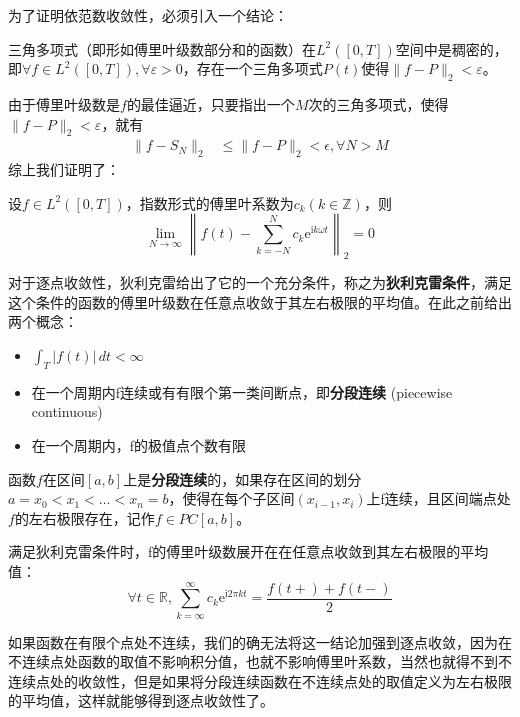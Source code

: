 \documentclass{ctexbook}
\begin{document}
为了证明依范数收敛性，必须引入一个结论：
\begin{claim}
    三角多项式（即形如傅里叶级数部分和的函数）在$L^2([0,T])$空间中是稠密的，即$\forall f\in L^2([0,T]),\forall \varepsilon >0$，存在一个三角多项式$P(t)$使得$\|f-P\|_2<\varepsilon$。
\end{claim}

由于傅里叶级数是$f$的最佳逼近，只要指出一个$M$次的三角多项式，使得$\|f-P\|_2<\varepsilon$，就有
\begin{align*}
    \|f-S_N\|_2 & \leq \|f-P\|_2<\epsilon,\forall N>M
\end{align*}
综上我们证明了：
\begin{theorem}[傅里叶级数的依范数收敛性]
    设$f\in L^2([0,T])$，指数形式的傅里叶系数为$c_k(k\in\mathbb{Z} )$，则
    \[\lim_{N \to \infty} \left\| f(t)-\sum_{k=-N}^{N}c_k \mathrm{e}^{\mathrm{i}k\omega t}\right\|_2=0\]
\end{theorem}

对于逐点收敛性，狄利克雷给出了它的一个充分条件，称之为\textbf{狄利克雷条件}，满足这个条件的函数的傅里叶级数在任意点收敛于其左右极限的平均值。在此之前给出两个概念：

\begin{definition}[狄利克雷条件]
    \quad
    \begin{itemize}[nosep, left=0pt]
    \item $\int_{T}|f(t)|\,dt<\infty$
    \item 在一个周期内f连续或有有限个第一类间断点，即\textbf{分段连续} (piecewise continuous)
    \item 在一个周期内，f的极值点个数有限
\end{itemize}
\end{definition}
\begin{definition}[分段连续]
    函数$f$在区间$[a,b]$上是\textbf{分段连续}的，如果存在区间的划分$a=x_0<x_1<\dots <x_n=b$，使得在每个子区间$(x_{i-1},x_i)$上f连续，且区间端点处$f$的左右极限存在，记作$f\in PC[a,b]$。
\end{definition}

\begin{theorem}[狄利克雷定理]
    满足狄利克雷条件时，f的傅里叶级数展开在在任意点收敛到其左右极限的平均值：
    \[\forall t\in \mathbb{R},\sum_{k=\infty}^{\infty}c_k \mathrm{e}^{\mathrm{i}2\pi kt}=\frac{f(t+)+f(t-)}{2}\]
\end{theorem}

如果函数在有限个点处不连续，我们的确无法将这一结论加强到逐点收敛，因为在不连续点处函数的取值不影响积分值，也就不影响傅里叶系数，当然也就得不到不连续点处的收敛性，但是如果将分段连续函数在不连续点处的取值定义为左右极限的平均值，这样就能够得到逐点收敛性了。
\end{document}

